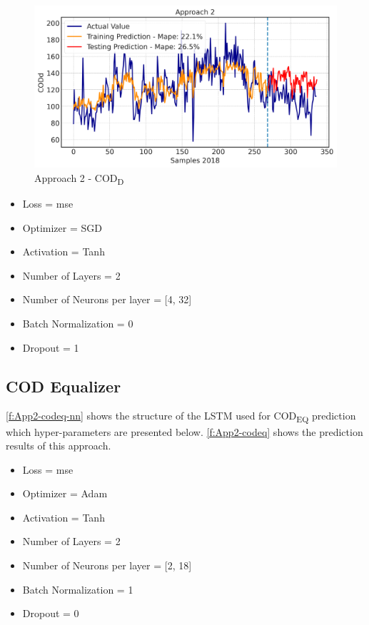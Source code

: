 \begin{figure}[h!]
\centering
\includegraphics[width=\linewidth]{figures/Ch5/CODd-2.png}
\caption{Approach 2 - COD\textsubscript{D}}
\label{f:App2-codd}
\end{figure}

\begin{itemize}
    \item Loss = mse
    \item Optimizer = SGD
    \item Activation =  Tanh
    \item Number of Layers = 2
    \item Number of Neurons per layer = [4, 32]
    \item Batch Normalization = 0
    \item Dropout = 1
\end{itemize}

\subsection{COD Equalizer}
\autoref{f:App2-codeq-nn} shows the structure of the \ac{LSTM} used for \ac{COD}\textsubscript{EQ} prediction which hyper-parameters are presented below. \autoref{f:App2-codeq} shows the prediction results of this approach.

\begin{itemize}
    \item Loss = mse
    \item Optimizer = Adam
    \item Activation =  Tanh
    \item Number of Layers = 2
    \item Number of Neurons per layer = [2, 18]
    \item Batch Normalization = 1
    \item Dropout = 0
\end{itemize}

